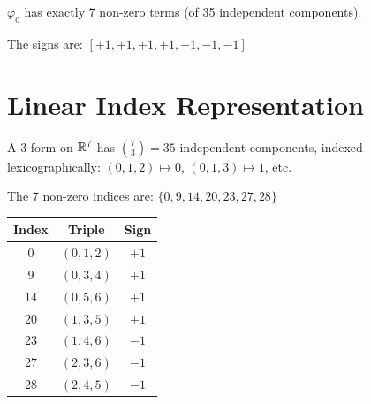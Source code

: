 \begin{theorem}\label{thm:phi0_seven}
    \leanok
    $\varphi_0$ has exactly 7 non-zero terms (of 35 independent components).
\end{theorem}

\begin{definition}\label{def:phi0_signs}
    \leanok
    The signs are: $[+1, +1, +1, +1, -1, -1, -1]$
\end{definition}

\section{Linear Index Representation}

\begin{definition}[C(7,3) Components]\label{def:35_components}
    \leanok
    A 3-form on $\mathbb{R}^7$ has $\binom{7}{3} = 35$ independent components,
    indexed lexicographically: $(0,1,2) \mapsto 0$, $(0,1,3) \mapsto 1$, etc.
\end{definition}

\begin{theorem}\label{thm:nonzero_indices}
    \leanok
    The 7 non-zero indices are: $\{0, 9, 14, 20, 23, 27, 28\}$

    \begin{center}
    \begin{tabular}{|c|c|c|}
    \hline
    \textbf{Index} & \textbf{Triple} & \textbf{Sign} \\
    \hline
    0 & $(0,1,2)$ & $+1$ \\
    9 & $(0,3,4)$ & $+1$ \\
    14 & $(0,5,6)$ & $+1$ \\
    20 & $(1,3,5)$ & $+1$ \\
    23 & $(1,4,6)$ & $-1$ \\
    27 & $(2,3,6)$ & $-1$ \\
    28 & $(2,4,5)$ & $-1$ \\
    \hline
    \end{tabular}
    \end{center}
\end{theorem}

